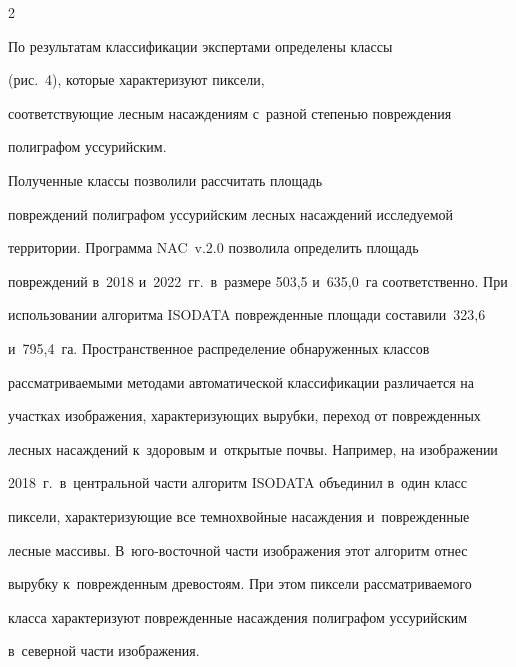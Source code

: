 \begin{multicols}{2}
  











  По результатам классификации экспертами определены классы 


(рис.~4), которые характеризуют пиксели, 


соответствующие лесным на\-саж\-де\-ни\-ям с~раз\-ной сте\-пенью по\-вреж\-де\-ния 


полиграфом уссурийским. 





Полученные классы позволили рассчитать площадь 


по\-вреж\-де\-ний полиграфом уссурийским лесных на\-саж\-де\-ний ис\-сле\-ду\-емой 


территории. Программа NAC~v.2.0 позволила определить площадь 


по\-вреж\-де\-ний в~2018 и~2022~гг.\ в~размере 503,5 и~635,0~га соответственно. При 


использовании алгоритма ISODATA по\-вреж\-де\-нные площади со\-ста\-ви\-ли~323,6 


и~795,4~га. Пространственное распределение обнаруженных классов 


рас\-смат\-ри\-ва\-емы\-ми методами автоматической классификации различается на 


участ\-ках изображения, ха\-рак\-те\-ри\-зу\-ющих вырубки, переход от поврежденных 


лес\-ных на\-саж\-де\-ний к~здоровым и~открытые поч\-вы. Например, на изображении 


2018~г.\ в~центральной час\-ти алгоритм ISODATA объединил в~один класс 


пиксели, ха\-рак\-те\-ри\-зу\-ющие все темнохвойные на\-саж\-де\-ния и~по\-вреж\-ден\-ные 


лесные массивы. В~юго-вос\-точ\-ной части изображения этот алгоритм отнес 


вы\-руб\-ку к~по\-вреж\-ден\-ным древостоям. При этом пиксели рас\-смат\-ри\-ва\-емо\-го 


клас\-са характеризуют по\-вреж\-ден\-ные насаждения полиграфом уссурийским 


в~северной час\-ти изоб\-ра\-же\-ния.


  





  



\end{multicols}
